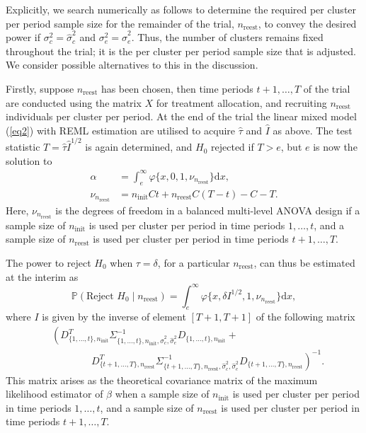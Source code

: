 \documentclass{article}
\begin{document}
Explicitly, we search numerically as follows to determine the required per cluster per period sample size for the remainder of the trial, $n_\text{reest}$, to convey the desired power if $\sigma_c^2=\hat{\sigma}_c^2$ and $\sigma_e^2=\hat{\sigma}_e^2$.  Thus, the number of clusters remains fixed throughout the trial; it is the per cluster per period sample size that is adjusted. We consider possible alternatives to this in the discussion.

Firstly, suppose $n_\text{reest}$ has been chosen, then time periods $t+1,\dots,T$ of the trial are conducted using the matrix $X$ for treatment allocation, and recruiting $n_\text{reest}$ individuals per cluster per period. At the end of the trial the linear mixed model (\ref{eq2}) with REML estimation are utilised to acquire $\hat{\tau}$ and $\hat{I}$ as above. The test statistic $T=\hat{\tau}\hat{I}^{1/2}$ is again determined, and $H_0$ rejected if $T>e$, but $e$ is now the solution to
\begin{align*}
\alpha &= \int_e^{\infty}\varphi\{x,0,1,\nu_{n_\text{reest}}\}\mathrm{d}x,\\
\nu_{n_\text{reest}} &= n_\text{init}Ct + n_\text{reest}C(T-t)-C-T.
\end{align*}
Here, $\nu_{n_\text{reest}}$ is the degrees of freedom in a balanced multi-level ANOVA design if a sample size of $n_\text{init}$ is used per cluster per period in time periods $1,\dots,t$, and a sample size of $n_\text{reest}$ is used per cluster per period in time periods $t+1,\dots,T$.

The power to reject $H_0$ when $\tau=\delta$, for a particular $n_\text{reest}$, can thus be estimated at the interim as
\[ \mathbb{P}(\text{Reject } H_0 \mid n_\text{reest}) = \int_e^{\infty}\varphi\{x,\delta I^{1/2},1,\nu_{n_\text{reest}}\}\mathrm{d}x,\]
where $I$ is given by the inverse of element $[T+1,T+1]$ of the following matrix
\begin{align*}
& \left(D_{\{1,\dots,t\},n_\text{init}}^T \Sigma_{\{1,\dots,t\},n_\text{init},\hat{\sigma}_c^2,\hat{\sigma}_e^2}^{-1} D_{\{1,\dots,t\},n_\text{init}} +\right. \\ & \qquad \qquad \left.D_{\{t+1,\dots,T\},n_\text{reest}}^T \Sigma_{\{t+1,\dots,T\},n_\text{reest},\hat{\sigma}_c^2,\hat{\sigma}_e^2}^{-1} D_{\{t+1,\dots,T\},n_\text{reest}}\right)^{-1}.
\end{align*}
This matrix arises as the theoretical covariance matrix of the maximum likelihood estimator of $\beta$ when a sample size of $n_\text{init}$ is used per cluster per period in time periods $1,\dots,t$, and a sample size of $n_\text{reest}$ is used per cluster per period in time periods $t+1,\dots,T$. 
\end{document}
